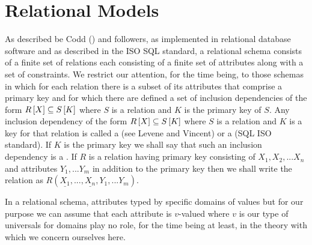 \section{Relational Models}
As described be Codd (\cite{Codd??}) and followers, as implemented in relational database software and as 
described in the ISO SQL standard, a relational schema consists of a finite set of relations each consisting of a
finite set of attributes along with a set of constraints.   We restrict our attention, for the time being, to those schemas in which for each relation there is a subset of its attributes that comprise a primary key and for which there are defined a set of inclusion dependencies of the 
form $R\left[X\right]\subseteq S\left[K\right]$ where $S$ is a relation and $K$ is the primary key of $S$.
Any inclusion dependency of the form $R\left[X\right]\subseteq S\left[K\right]$ where $S$ is a relation and $K$ is a key for that relation is called a  (see Levene and Vincent) or a  (SQL ISO standard).
If $K$ is the primary key we shall say that such an inclusion dependency is a . If $R$ is a relation having primary key consisting
of $X_1,X_2,...X_n$ and attributes $Y_1,...Y_m$ in addition to the primary key 
 then we shall write the relation as $R(\underline{X_1},...,\underline{X_n},Y_1,...Y_m)$.

In a relational schema, attributes typed by specific domains of values but for our purpose we can assume that each attribute is $v$-valued where $v$ is our type of universals for domains play no role, for the time being at least, in the theory with which we concern ourselves here.
